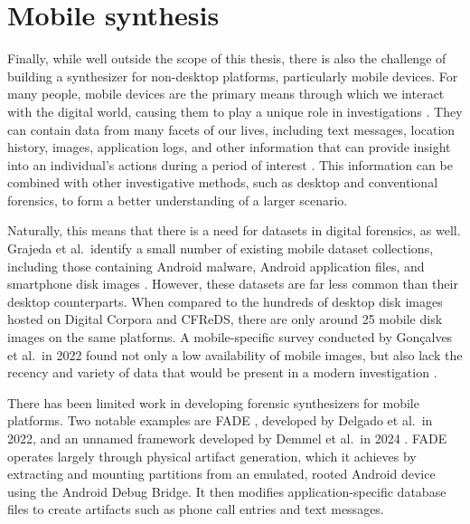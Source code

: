 \documentclass[letterpaper,12pt]{report}
\begin{document}
\section{Mobile synthesis}\label{mobile-synthesis}

Finally, while well outside the scope of this thesis, there is also the
challenge of building a synthesizer for non-desktop platforms,
particularly mobile devices. For many people, mobile devices are the
primary means through which we interact with the digital world, causing
them to play a unique role in investigations
\cite{chernyshevMobileForensicsAdvances2017}. They can contain data
from many facets of our lives, including text messages, location
history, images, application logs, and other information that can
provide insight into an individual's actions during a period of interest
\cite{sutiknoCapabilitiesCellebriteUniversal2024}. This information
can be combined with other investigative methods, such as desktop and
conventional forensics, to form a better understanding of a larger
scenario.

Naturally, this means that there is a need for datasets in digital
forensics, as well. Grajeda et al.~identify a small number of existing
mobile dataset collections, including those containing Android malware,
Android application files, and smartphone disk images
\cite{grajedaAvailabilityDatasetsDigital2017}. However, these
datasets are far less common than their desktop counterparts. When
compared to the hundreds of desktop disk images hosted on Digital
Corpora and CFReDS, there are only around 25 mobile disk images on the
same platforms. A mobile-specific survey conducted by Gonçalves et
al.~in 2022 found not only a low availability of mobile images, but also
lack the recency and variety of data that would be present in a modern
investigation \cite{goncalvesRevisitingDatasetGap2022}.

There has been limited work in developing forensic synthesizers for
mobile platforms. Two notable examples are FADE
\cite{ceballosdelgadoFADEForensicImage2022}, developed by Delgado et
al.~in 2022, and an unnamed framework developed by Demmel et al.~in 2024
\cite{demmelDataSynthesisGoing2024}. FADE operates largely through
physical artifact generation, which it achieves by extracting and
mounting partitions from an emulated, rooted Android device using the
Android Debug Bridge. It then modifies application-specific database
files to create artifacts such as phone call entries and text messages.
\end{document}
